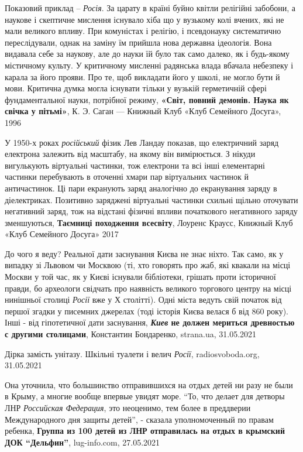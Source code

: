 Показовий приклад – \emph{Росія}. За царату в країні буйно квітли релігійні забобони,
а наукове і скептичне мислення існувало хіба що у вузькому колі вчених, які
не мали великого впливу. При комуністах і релігію, і псевдонауку систематично
переслідували, однак на заміну їм прийшла нова державна ідеологія. Вона
видавала себе за наукову, але до науки їй було так само далеко, як і будь-якому
містичному культу. У критичному мисленні радянська влада вбачала небезпеку і
карала за його прояви. Про те, щоб викладати його у школі, не могло бути й
мови. Критична думка могла існувати тільки у вузькій герметичній сфері
фундаментальної науки, потрібної режиму,
\textbf{«Світ, повний демонів. Наука як свічка у пітьмі»}, К. Э. Саган —
Книжный Клуб «Клуб Семейного Досуга», 1996

У 1950-х роках \emph{російський} фізик Лев Ландау показав, що електричний заряд
електрона залежить від масштабу, на якому він вимірюється. З нікуди вигулькують
віртуальні частинки, тож електрони та всі інші елементарні частинки перебувають
в оточенні хмари пар віртуальних частинок й античастинок. Ці пари екранують
заряд аналогічно до екранування заряду в діелектриках. Позитивно заряджені
віртуальні частинки схильні щільно оточувати негативний заряд, тож на відстані
фізичні впливи початкового негативного заряду зменшуються, \textbf{Таємниці
походження всесвіту}, Лоуренс Краусс, Книжный Клуб «Клуб Семейного Досуга» 2017

До чого я веду? Реальної дати заснування Києва не знає ніхто. Так само, як у
випадку зі Львовом чи Москвою (ті, хто говорять про жаб, які квакали на місці
Москви у той час, як у Києві існували бібліотеки, грішать проти історичної
правди, бо археологи свідчать про наявність великого торгового центру на місці
нинішньої столиці \emph{Росії} вже у Х столітті). Одні міста ведуть свій
початок від першої згадки у писемних джерелах (тоді історія Києва велася б від
860 року).  Інші - від гіпотетичної дати заснування, \textbf{\emph{Киев} не
должен мериться древностью с другими столицами}, Константин Бондаренко,
strana.ua, 31.05.2021

Дірка замість унітазу. Шкільні туалети і велич \emph{Росії}, radiosvoboda.org,
31.05.2021

Она уточнила, что большинство отправившихся на отдых детей ни разу не были в
Крыму, а многие вообще впервые увидят море.  \enquote{То, что делает для
детворы ЛНР \emph{Российская Федерация}, это неоценимо, тем более в преддверии
Международного дня защиты детей}, - сказала уполномоченный по правам ребенка,
\textbf{Группа из 100 детей из ЛНР отправилась на отдых в крымский ДОК
\enquote{Дельфин}}, lug-info.com, 27.05.2021

